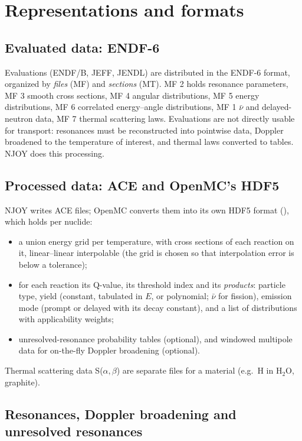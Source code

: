 \section{Representations and formats}\label{sec:nd:formats}

\subsection{Evaluated data: ENDF-6}

Evaluations (ENDF/B, JEFF, JENDL) are distributed in the ENDF-6 format, organized by \emph{files}
(MF) and \emph{sections} (MT). MF 2 holds resonance parameters, MF 3 smooth cross sections, MF 4
angular distributions, MF 5 energy distributions, MF 6 correlated energy--angle distributions, MF 1
$\bar\nu$ and delayed-neutron data, MF 7 thermal scattering laws. Evaluations are not directly
usable for transport: resonances must be reconstructed into pointwise data, Doppler broadened to the
temperature of interest, and thermal laws converted to tables. NJOY does this processing.

\subsection{Processed data: ACE and OpenMC's HDF5}

NJOY writes ACE files; OpenMC converts them into its own HDF5 format (), which
holds per nuclide:
\begin{itemize}
\item a union energy grid per temperature, with cross sections of each reaction on it,
  linear--linear interpolable (the grid is chosen so that interpolation error is below a tolerance);
\item for each reaction its Q-value, its threshold index and its \emph{products}: particle type,
  yield (constant, tabulated in $E$, or polynomial; $\bar\nu$ for fission), emission mode (prompt
  or delayed with its decay constant), and a list of distributions with applicability weights;
\item unresolved-resonance probability tables (optional), and windowed multipole data for
  on-the-fly Doppler broadening (optional).
\end{itemize}
Thermal scattering data S($\alpha,\beta$) are separate files for a material (e.g.\ H in H$_2$O,
graphite).

\subsection{Resonances, Doppler broadening and unresolved resonances}

